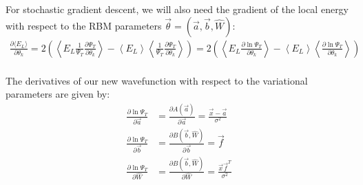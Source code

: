 \documentclass[12pt]{article}
\begin{document}
\noindent For stochastic gradient descent, we will also need the gradient of the local energy with respect to the RBM parameters $\vec{\theta}=(\vec{a},\vec{b},\hat{W})$:
\begin{align*}
\frac{\partial \langle E_L \rangle}{\partial \theta_k} = 2 \left( \left\langle E_L \frac{1}{\Psi_T} \frac{\partial \Psi_T}{\partial \theta_k} \right\rangle - \left\langle E_L \right\rangle \left\langle \frac{1}{\Psi_T} \frac{\partial \Psi_T}{\partial \theta_k} \right\rangle \right)= 2 \left( \left\langle E_L \frac{\partial \ln \Psi_T}{\partial \theta_k} \right\rangle - \left\langle E_L \right\rangle \left\langle \frac{\partial \ln \Psi_T}{\partial \theta_k} \right\rangle \right)\\
\end{align*}



\noindent The derivatives of our new wavefunction with respect to the variational parameters are given by:
\begin{align*}
\frac{\partial \ln  \Psi_T}{\partial \vec{a}} &= \frac{\partial A(\vec{a})}{\partial \vec{a}} = \frac{\vec{x}-\vec{a}}{\sigma^2}\\
\frac{\partial \ln \Psi_T}{\partial \vec{b}} &=  \frac{\partial B(\vec{b},\hat{W})}{\partial \vec{b}} =  \vec{f} \\
\frac{\partial \ln \Psi_T}{\partial \hat{W}} &=  \frac{\partial B(\vec{b},\hat{W})}{\partial \hat{W}}
= \frac{\vec{x} \vec{f}^T}{\sigma^2}
\end{align*}
\end{document}
